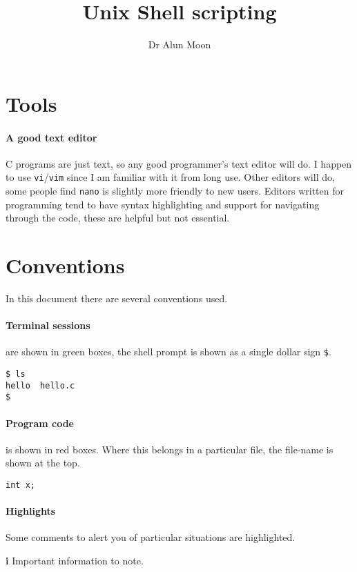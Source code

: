 \documentclass[12pt,a4paper]{article}
\title{Unix Shell scripting}
\author{Dr Alun Moon}
\begin{document}
\maketitle

\section{Tools}

\paragraph{A good text editor} C programs are just text, so any
good programmer's text editor will do.  I happen to use \verb'vi'/\verb'vim'
since I am familiar with it from long use.  Other editors will do, some people
find \verb'nano' is slightly more friendly to new users.  Editors written for
programming tend to have syntax highlighting and support for navigating through
the code, these are helpful but not essential.

\section{Conventions}
In this document there are several conventions used.

\paragraph{Terminal sessions} are shown in green boxes, the shell prompt is
shown as a single dollar sign \verb'$'.
\begin{terminal}
\begin{verbatim}
$ ls
hello  hello.c
$
\end{verbatim}
\end{terminal}

\paragraph{Program code} is shown in red boxes.  Where this belongs in a
particular file, the file-name is shown at the top.
\begin{code}[title=filename.c]
\begin{verbatim}
int x;
\end{verbatim}
\end{code}

\paragraph{Highlights}
Some comments to alert you of particular situations are highlighted.
\begin{note}{\Large\textbf{i}}
        Important information to note.
\end{note}
\end{document}
